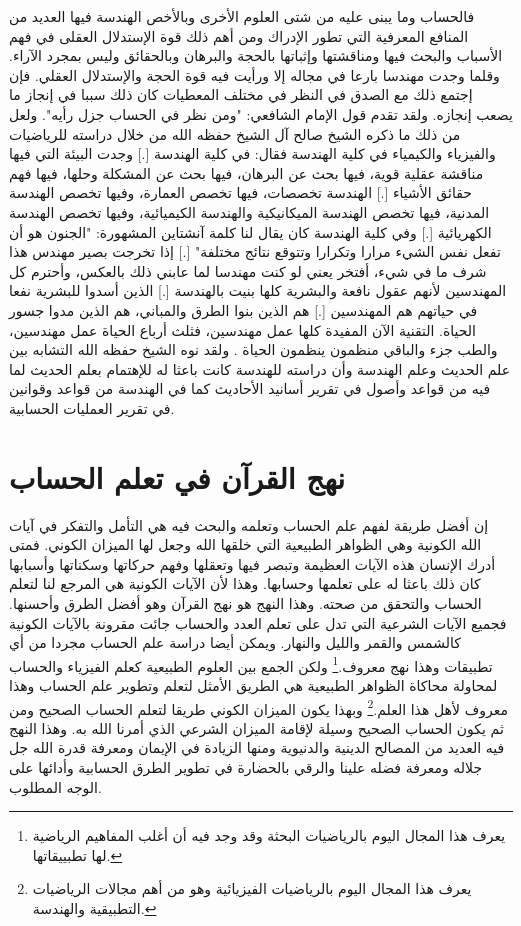 فالحساب وما يبنى عليه من شتى العلوم الأخرى وبالأخص الهندسة فيها العديد من المنافع المعرفية التي تطور الإدراك ومن أهم ذلك قوة الإستدلال العقلى في فهم الأسباب والبحث فيها ومناقشتها وإثباتها بالحجة والبرهان وبالحقائق وليس بمجرد الآراء. وقلما وجدت مهندسا بارعا في مجاله إلا ورأيت فيه قوة الحجة والإستدلال العقلي. فإن إجتمع ذلك مع الصدق في النظر في مختلف المعطيات كان ذلك سببا في إنجاز ما يصعب إنجازه. ولقد تقدم قول الإمام الشافعي: "ومن نظر في الحساب جزل رأيه". ولعل من ذلك ما ذكره الشيخ صالح آل الشيخ حفظه الله من خلال دراسته للرياضيات والفيزياء والكيمياء في كلية الهندسة فقال: في كلية الهندسة [.] وجدت البيئة التي فيها مناقشة عقلية قوية، فيها بحث عن البرهان، فيها بحث عن المشكلة وحلها، فيها فهم حقائق الأشياء [.] الهندسة تخصصات، فيها تخصص العمارة، وفيها تخصص الهندسة المدنية، فيها تخصص الهندسة الميكانيكية والهندسة الكيميائية، وفيها تخصص الهندسة الكهريائية [.] وفي كلية الهندسة كان يقال لنا كلمة آنشتاين المشهورة: "الجنون هو أن تفعل نفس الشيء مرارا وتكرارا وتتوقع نتائج مختلفة" [.] إذا تخرجت بصير مهندس هذا شرف ما في شيء، أفتخر يعني لو كنت مهندسا لما عابني ذلك بالعكس، وأحترم كل المهندسين لأنهم عقول نافعة والبشرية كلها بنيت بالهندسة [.] الذين أسدوا للبشرية نفعا في حياتهم هم المهندسين [.] هم الذين بنوا الطرق والمباني، هم الذين مدوا جسور الحياة. التقنية الآن المفيدة كلها عمل مهندسين، فثلث أرباع الحياة عمل مهندسين، والطب جزء والباقي منظمون ينظمون الحياة \href{https://www.youtube.com/watch?v=kw_s0K_zbqc}{\faExternalLink}. ولقد نوه الشيخ حفظه الله التشابه بين علم الحديث وعلم الهندسة وأن دراسته للهندسة كانت باعثا له للإهتمام بعلم الحديث لما فيه من قواعد وأصول في تقرير أسانيد الأحاديث كما في الهندسة من قواعد وقوانين في تقرير العمليات الحسابية.

\section{نهج القرآن في تعلم الحساب}

إن أفضل طريقة لفهم علم الحساب وتعلمه والبحث فيه هي التأمل والتفكر في آيات الله الكونية وهي الظواهر الطبيعية التي خلقها الله وجعل لها الميزان الكوني. فمتى أدرك الإنسان هذه الآيات العظيمة وتبصر فيها وتعقلها وفهم حركاتها وسكناتها وأسبابها كان ذلك باعثا له على تعلمها وحسابها. وهذا لأن الآيات الكونية هي المرجع لنا لتعلم الحساب والتحقق من صحته. وهذا النهج هو نهج القرآن وهو أفضل الطرق وأحسنها. فجميع الآيات الشرعية التي تدل على تعلم العدد والحساب جائت مقرونة بالآيات الكونية كالشمس والقمر والليل والنهار. ويمكن أيضا دراسة علم الحساب مجردا من أي تطبيقات وهذا نهج معروف.\footnote{يعرف هذا المجال اليوم بالرياضيات البحثة وقد وجد فيه أن أغلب المفاهيم الرياضية لها تطبييقاتها.} ولكن الجمع بين العلوم الطبيعية كعلم الفيزياء والحساب لمحاولة محاكاة الظواهر الطبيعية هي الطريق الأمثل لتعلم وتطوير علم الحساب وهذا معروف لأهل هذا العلم.\footnote{يعرف هذا المجال اليوم بالرياضيات الفيزيائية وهو من أهم مجالات الرياضيات التطبيقية والهندسة.} وبهذا يكون الميزان الكوني طريقا لتعلم الحساب الصحيح ومن ثم يكون الحساب الصحيح وسيلة لإقامة الميزان الشرعي الذي أمرنا الله به. وهذا النهج فيه العديد من المصالح الدينية والدنيوية ومنها الزيادة في الإيمان ومعرفة قدرة الله جل جلاله ومعرفة فضله علينا والرقي بالحضارة في تطوير الطرق الحسابية وأدائها على الوجه المطلوب.

